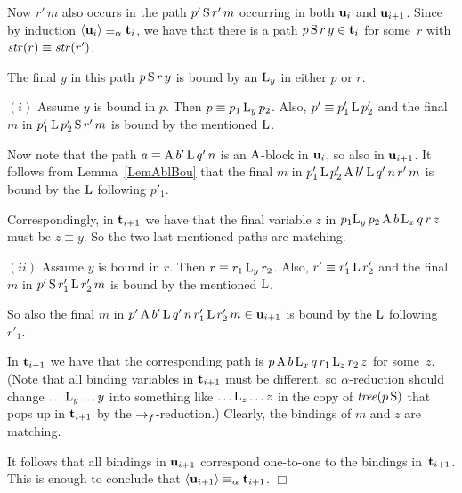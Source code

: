 \documentclass{article}
\theoremstyle{plain}
\theoremstyle{definition}
\begin{document}
{Now $r' \, m$ also occurs in the path $p'\, {\rm S} \, r' \, m$ occurring in both ${\bf u}_{i}$ and ${\bf u}_{i+1}$. Since by induction $\langle {\bf u}_i \rangle \equiv_{\alpha} {\bf t}_i$, we have that there is a path $p \, {\rm S} \, r \, y \in {\bf t}_i$ for some~$r$ with ${\it str}(r) \equiv {\it str}(r')$.

The final $y$ in this path $p \, {\rm S} \, r \, y$ is bound by an ${\rm L}_y$ in either $p$ or $r$.

\smallskip

$(i)$ Assume $y$ is bound in $p$. Then $p \equiv p_1 \, {\rm L}_y \, p_2$. Also, $p' \equiv p'_1 \, {\rm L} \, p'_2$ and the final $m$ in $p'_1 \, {\rm L} \, p'_2 \, {\rm S} \, r' \, m$ is bound by the mentioned ${\rm L}$.

Now note that the path $a \equiv {\rm A} \, b' \, {\rm L} \, q' \, n$ is an ${\rm A}$-block in ${\bf u}_{i}$, so also in ${\bf u}_{i+1}$. It follows from Lemma~\ref{LemAblBou} that the final $m$ in $p'_1 \, {\rm L} \, p'_2 \, {\rm A} \, b' \, {\rm L} \, q' \, n \, r' \, m$ is bound by the ${\rm L}$ following $p'_1$.

Correspondingly, in ${\bf t}_{i+1}$ we have that the final variable $z$ in $p_1 {\rm L}_y \, p_2 \, {\rm A} \, b \, {\rm L}_x \, q \, r \, z$ must be $z \equiv y$. So the two last-mentioned paths are matching.



\smallskip

$(ii)$ Assume $y$ is bound in $r$. Then $r \equiv r_1 \, {\rm L}_y \, r_2$. Also, $r' \equiv r'_1 \, {\rm L} \, r'_2$ and the final $m$ in $p' \, {\rm S} \, r'_1 \, {\rm L} \, r'_2 \, m$ is bound by the mentioned ${\rm L}$.

So also the final $m$ in $p' \, {\rm A} \, b' \, {\rm L} \, q' \, n \, r'_1 \, {\rm L} \, r'_2 \, m \in {\bf u}_{i+1}$ is bound by the ${\rm L}$ following~$r'_1$.

In ${\bf t}_{i+1}$ we have that the corresponding path is $p \, {\rm A} \, b \, {\rm L}_x \, q \, r_1 \, {\rm L}_z \, r_2 \, z$ for some~$z$. (Note that all binding variables in ${\bf t}_{i+1}$ must be different, so $\alpha$-reduction should change $\ldots {\rm L}_y \ldots y$ into something like $\ldots {\rm L}_z \ldots z$ in the copy of ${\it tree}(p \, {\rm S})$ that pops up in ${\bf t}_{i+1}$ by the $\rightarrow_f$-reduction.) Clearly, the bindings of $m$ and $z$ are matching.

\smallskip

It follows that all bindings in ${\bf u}_{i+1}$ correspond one-to-one to the bindings in~${\bf t}_{i+1}$. This is enough to conclude that $\langle {\bf u}_{i+1} \rangle \equiv_{\alpha} {\bf t}_{i+1}$. $\Box$

}
\end{document}
